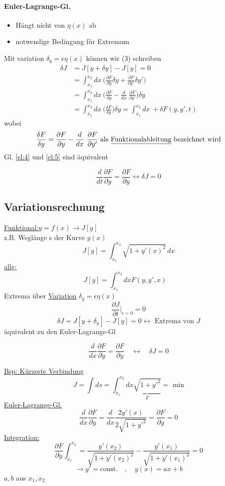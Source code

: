 \documentclass[titlepage,12pt,a4paper,ngerman]{report}
\newcommand{\tx}[1]{\textrm{#1}}
\newcommand{\ub}[1]{\underbrace{#1}}
\newcommand{\const}{\tx{const.}}
\newcommand{\frbox}[2]{\begin{tcolorbox}[colback=white,colframe=red!75!black,fonttitle=\bfseries,title=#1]#2\end{tcolorbox}} %
\begin{document}
{\paragraph{Euler-Lagrange-Gl.}
\begin{itemize}
	\item Hängt nicht von $\eta(x)$ ab
	\item notwendige Bedingung für Extremum
\end{itemize}
Mit variation $\delta_y = \epsilon \eta(x)$ können wir (3) schreiben
\begin{align}\label{el:5}
\delta J &= J[y + \delta y] - J[y] = 0 \tag*{(5)}\\
&= \int_{x_1}^{x_2} dx\ \bigg(\frac{\partial F}{\partial y} \delta y + \frac{\partial F}{\partial y'} \delta y'\bigg) \nonumber\\
&= \int_{x_1}^{x_2} dx\ \bigg(\frac{\partial F}{\partial y} - \frac{d}{dx}\ \frac{\partial F}{\partial y'}\bigg)\delta y \nonumber\\
&= \int_{x_1}^{x_2} dx\ \bigg(\frac{\delta F}{\delta y}\bigg)\delta y = \int_{x_1}^{x_2} dx\ + \delta F(y,y',t) \nonumber
\end{align}
wobei $$\frac{\delta F}{\delta y} = \frac{\partial F}{\partial y} - \frac{d}{dx}\ \frac{\partial F}{\partial y'} \tx{ als \underline{Funktionalableitung} bezeichnet wird}$$
Gl. \ref{el:4} und \ref{el:5} sind äquivalent
\frbox{\tx{,,}Variationsprinzip\tx{``}}{$$\frac{d}{dt}\frac{\partial F}{\partial y} = \frac{\partial F}{\partial y} \leftrightarrow \delta J = 0$$}


\subsection{Variationsrechnung}
\underline{Funktional:}$ y=f(x) \rightarrow J[y] $\\
z.B. Weglänge s der Kurve $ y(x) $
$$J[y] = \int_{x_1}^{x_2} \sqrt{1+y'(x)^2} \, dx$$
\underline{allg:} $$ J[y] = \int_{x_1}^{x_2} dx F(y,y',x) \quad $$
Extrema über \underline{Variation} $ \delta_y = \epsilon \eta (x) $
$$ \frac{\partial J}{\partial t} \bigg|_{\epsilon=0} = 0$$
$$ \delta J = J[y+\delta_y] - J[y] = 0 \leftrightarrow \tx{ Extrema von } J$$
äquivalent zu den Euler-Lagrange-Gl
\frbox{Extremalbedingungen}{$$\frac{d}{dx} \frac{\partial F}{\partial \dot{y}} = \frac{\partial F}{\partial y} \quad \leftrightarrow \quad \delta J = 0 $$}
\underline{Bsp: Kürzeste Verbindung}
$$J = \int ds = \int_{x_1}^{x_2} dx \ub{\sqrt{1 + y'^2}}_{F} = \tx{ min} $$
\underline{Euler-Lagrange-Gl.}
$$\frac{d}{dx} \frac{\partial F}{\partial \dot{y}} = \frac{d}{dx} \frac{2 y'(x)}{2 \sqrt{1 + y'^2}} = \frac{\partial F}{\partial y} = 0 $$
\underline{Integration:}$$\frac{\partial F}{\partial \dot{y}} \int_{x_1}^{x_2} = \frac{y'(x_2)}{\sqrt{1+y'(x_2)^2}} - \frac{y'(x_1)}{\sqrt{1+y'(x_1)^2}} =0 $$
$$\rightarrow y' = \const \quad , \quad y(x)= ax+b$$
$a,b$ aus $ x_1,x_2 $
}
\end{document}
